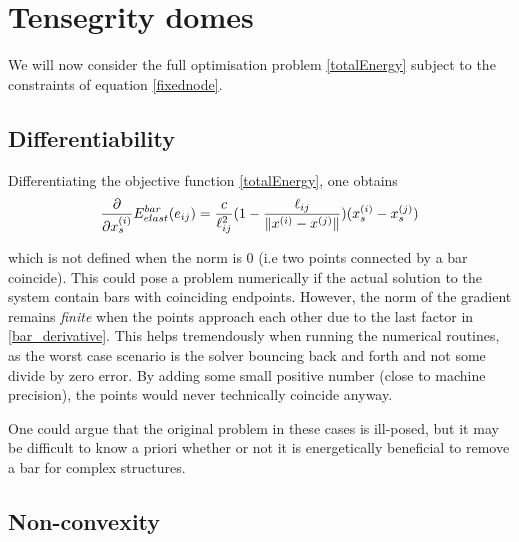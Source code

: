 \section{Tensegrity domes}
We will now consider the full optimisation problem \eqref{totalEnergy} subject to the constraints of equation \ref{fixednode}.

\subsection{Differentiability}
Differentiating the objective function \eqref{totalEnergy}, one obtains
\begin{equation}
\frac{\partial}{\partial x_s^{(i)}} E^{bar}_{elast}(e_{ij}) = \frac{c}{\ell_{ij}^2} (1- \frac{\ell_{ij}}{\lVert x^{(i)} - x^{(j)}\rVert}) (x_s^{(i)} - x_s^{(j)})
\label{bar_derivative}
\end{equation}

which is not defined when the norm is $0$ (i.e two points connected by a bar coincide). This could pose a problem numerically if the actual solution to the system contain bars with coinciding endpoints. However, the norm of the gradient remains \emph{finite} when the points approach each other due to the last factor in \eqref{bar_derivative}. This helps tremendously when running the numerical routines, as the worst case scenario is the solver bouncing back and forth and not some divide by zero error. By adding some small positive number (close to machine precision), the points would never technically coincide anyway.

One could argue that the original problem in these cases is ill-posed, but it may be difficult to know a priori whether or not it is energetically beneficial to remove a bar for complex structures. 

\subsection{Non-convexity}

